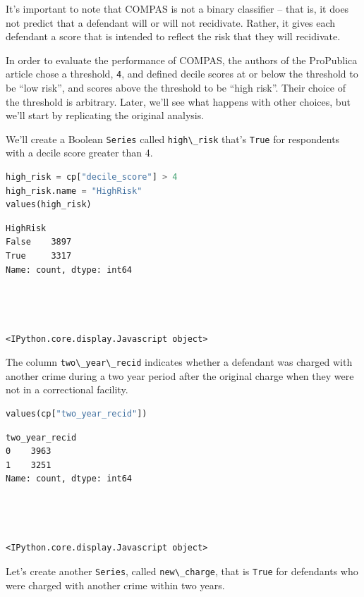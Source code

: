 It's important to note that COMPAS is not a binary classifier -- that
is, it does not predict that a defendant will or will not recidivate.
Rather, it gives each defendant a score that is intended to reflect the
risk that they will recidivate.

In order to evaluate the performance of COMPAS, the authors of the
ProPublica article chose a threshold, \passthrough{\lstinline!4!}, and
defined decile scores at or below the threshold to be ``low risk'', and
scores above the threshold to be ``high risk''. Their choice of the
threshold is arbitrary. Later, we'll see what happens with other
choices, but we'll start by replicating the original analysis.

We'll create a Boolean \passthrough{\lstinline!Series!} called
\passthrough{\lstinline!high\_risk!} that's
\passthrough{\lstinline!True!} for respondents with a decile score
greater than 4.

\begin{lstlisting}[language=Python,style=source]
high_risk = cp["decile_score"] > 4
high_risk.name = "HighRisk"
values(high_risk)
\end{lstlisting}

\begin{lstlisting}[style=output]
HighRisk
False    3897
True     3317
Name: count, dtype: int64




<IPython.core.display.Javascript object>
\end{lstlisting}

The column \passthrough{\lstinline!two\_year\_recid!} indicates whether
a defendant was charged with another crime during a two year period
after the original charge when they were not in a correctional facility.

\begin{lstlisting}[language=Python,style=source]
values(cp["two_year_recid"])
\end{lstlisting}

\begin{lstlisting}[style=output]
two_year_recid
0    3963
1    3251
Name: count, dtype: int64




<IPython.core.display.Javascript object>
\end{lstlisting}

Let's create another \passthrough{\lstinline!Series!}, called
\passthrough{\lstinline!new\_charge!}, that is
\passthrough{\lstinline!True!} for defendants who were charged with
another crime within two years.

